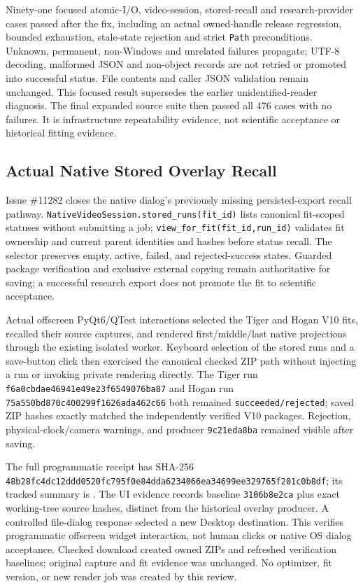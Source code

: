 \documentclass[11pt,letterpaper]{article}
\newcommand{\code}[1]{\nolinkurl{#1}}
\newcommand{\hash}[1]{{\footnotesize\nolinkurl{#1}}}
\begin{document}
Ninety-one focused atomic-I/O, video-session, stored-recall and research-provider
cases passed after the fix, including an actual owned-handle release regression,
bounded exhaustion, stale-state rejection and strict \code{Path} preconditions.
Unknown, permanent, non-Windows and unrelated failures propagate; UTF-8 decoding,
malformed JSON and non-object records are not retried or promoted into successful
status. File contents and caller JSON validation remain unchanged. This focused
result supersedes the earlier unidentified-reader diagnosis. The final expanded
source suite then passed all 476 cases with no failures. It is infrastructure
repeatability evidence, not scientific acceptance or historical fitting evidence.

\subsection{Actual Native Stored Overlay Recall}
Issue \#11282 closes the native dialog's previously missing persisted-export
recall pathway. \code{NativeVideoSession.stored_runs(fit_id)} lists canonical
fit-scoped statuses without submitting a job;
\code{view_for_fit(fit_id,run_id)} validates fit ownership and current parent
identities and hashes before status recall. The selector preserves empty,
active, failed, and rejected-success states. Guarded package verification and
exclusive external copying remain authoritative for saving; a successful
research export does not promote the fit to scientific acceptance.

Actual offscreen PyQt6/QTest interactions selected the Tiger and Hogan V10
fits, recalled their source captures, and rendered first/middle/last native
projections through the existing isolated worker. Keyboard selection of the
stored runs and a save-button click then exercised the canonical checked ZIP
path without injecting a run or invoking private rendering directly. The
Tiger run \code{f6a0cbdae46941e49e23f6549076ba87} and Hogan run
\code{75a550bd870c400299f1626ada462c66} both remained
\code{succeeded/rejected}; saved ZIP hashes exactly matched the independently
verified V10 packages. Rejection, physical-clock/camera warnings, and producer
\code{9c21eda8ba} remained visible after saving.

The full programmatic receipt has SHA-256
\hash{48b28fc4dc12ddd0520fc795f0e84dda6234066ea34699ee329765f201c0b8df};
its tracked summary is .
The UI evidence records baseline \code{3106b8e2ca} plus exact working-tree
source hashes, distinct from the historical overlay producer. A controlled
file-dialog response selected a new Desktop destination. This verifies
programmatic offscreen widget interaction, not human clicks or native OS
dialog acceptance. Checked download created owned ZIPs and refreshed
verification baselines; original capture and fit evidence was unchanged.
No optimizer, fit version, or new render job was created by this review.
\end{document}
